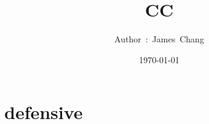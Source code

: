

\title{CC}
\author{ {\Biohazard} \hspace{1.5mm} \hspace{1.5mm} Author\ :\ James\ Chang}
\date{\today}


\large

\tableofcontents

\chapter{defensive}




